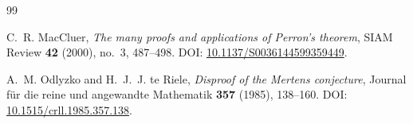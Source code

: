 \documentclass[11pt]{amsart}
\numberwithin{equation}{section}
\theoremstyle{plain}
\theoremstyle{definition}
\theoremstyle{remark}
\begin{document}
\begin{thebibliography}{99}

C.~R. MacCluer,
\emph{The many proofs and applications of Perron's theorem},
SIAM Review \textbf{42} (2000), no.~3, 487--498.
DOI: \href{https://doi.org/10.1137/S0036144599359449}{10.1137/S0036144599359449}.

A.~M. Odlyzko and H.~J.~J. te Riele,
\emph{Disproof of the Mertens conjecture},
Journal f\"ur die reine und angewandte Mathematik \textbf{357} (1985), 138--160.
DOI: \href{https://doi.org/10.1515/crll.1985.357.138}{10.1515/crll.1985.357.138}.

\end{thebibliography}
\end{document}
